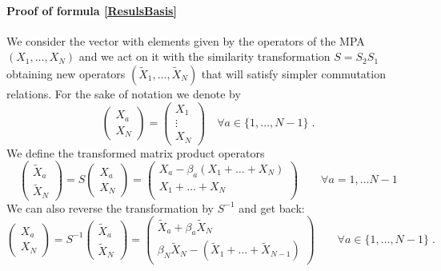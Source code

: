 \documentclass[10pt]{article}
\numberwithin{equation}{section}
\numberwithin{equation}{subsection}
\newcommand{\Xt}{\widetilde{X}}
\newcommand{\dt}{\;.}
\begin{document}
\paragraph{Proof of formula \eqref{ResulsBasis}} 
We consider the vector with elements given by the operators of the MPA $(X_{1},\ldots,X_{N})$ and we act on it with the similarity transformation $S=S_{2}S_{1}$ obtaining new operators $(\Xt_{1},\ldots,\Xt_{N})$ that will satisfy simpler commutation relations. 
For the sake of notation we denote by
\begin{equation}
    \begin{pmatrix}
		X_{a}\\ 
		X_{N}
	\end{pmatrix}=\begin{pmatrix}
	    X_{1}\\
     \vdots\\
     X_{N}
	\end{pmatrix}\quad \forall a\in \{1,\ldots,N-1\}\dt
\end{equation}
We define the transformed matrix product operators
\begin{equation}\label{Xtildes2b}
	\begin{pmatrix}
		\Xt_{a}\\ 
		\Xt_{N}
	\end{pmatrix} =S\begin{pmatrix}
		X_{a}\\X_{N}
	\end{pmatrix}=\begin{pmatrix} 
		X_{a}-\beta_{a}(X_{1}+\ldots+X_{N})\\
				X_{1}+\ldots +X_{N}\\
	\end{pmatrix}%
	\qquad \forall a=1,\ldots N-1
\end{equation}
We can also reverse the transformation by $S^{-1}$ and get back: 
\begin{equation}\label{Xes}
	\begin{pmatrix}
		X_{a}\\
		X_{N} 
	\end{pmatrix} =S^{-1}\begin{pmatrix}
		\widetilde{X}_{a}\\
		\widetilde{X}_{N}
	\end{pmatrix}=\begin{pmatrix}
		\Xt_{a}+\beta_{a}\Xt_{N}\\ 
		\beta_N\Xt_{N}-(\Xt_{1}+\ldots+\Xt_{N-1})
	\end{pmatrix}\qquad\forall a\in \{1,\ldots,N-1\}\dt
\end{equation}
\end{document}
